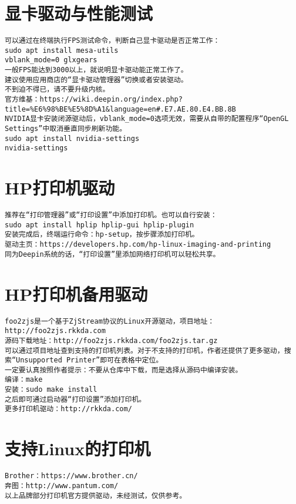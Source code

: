 \documentclass[a4paper,fontset=fandol,zihao=-4,linespread=1.2,oneside]{ctexbook}
\begin{document}
\section{显卡驱动与性能测试}
\begin{lstlisting}
可以通过在终端执行FPS测试命令，判断自己显卡驱动是否正常工作：
sudo apt install mesa-utils
vblank_mode=0 glxgears
一般FPS能达到3000以上，就说明显卡驱动能正常工作了。
建议使用应用商店的“显卡驱动管理器”切换或者安装驱动。
不到迫不得已，请不要升级内核。
官方维基：https://wiki.deepin.org/index.php?title=%E6%98%BE%E5%8D%A1&language=en#.E7.AE.80.E4.BB.8B
NVIDIA显卡安装闭源驱动后，vblank_mode=0选项无效，需要从自带的配置程序“OpenGL Settings”中取消垂直同步刷新功能。
sudo apt install nvidia-settings
nvidia-settings
\end{lstlisting}

\section{HP打印机驱动}
\begin{lstlisting}
推荐在“打印管理器”或“打印设置”中添加打印机。也可以自行安装：
sudo apt install hplip hplip-gui hplip-plugin
安装完成后，终端运行命令：hp-setup，按步骤添加打印机。
驱动主页：https://developers.hp.com/hp-linux-imaging-and-printing
同为Deepin系统的话，“打印设置”里添加网络打印机可以轻松共享。
\end{lstlisting}

\section{HP打印机备用驱动}
\begin{lstlisting}
foo2zjs是一个基于ZjStream协议的Linux开源驱动，项目地址：http://foo2zjs.rkkda.com
源码下载地址：http://foo2zjs.rkkda.com/foo2zjs.tar.gz
可以通过项目地址查到支持的打印机列表。对于不支持的打印机，作者还提供了更多驱动，搜索“Unsupported Printer”即可在表格中定位。
一定要认真按照作者提示：不要从仓库中下载，而是选择从源码中编译安装。
编译：make
安装：sudo make install
之后即可通过启动器“打印设置”添加打印机。
更多打印机驱动：http://rkkda.com/
\end{lstlisting}

\section{支持Linux的打印机}
\begin{lstlisting}
Brother：https://www.brother.cn/
奔图：http://www.pantum.com/
以上品牌部分打印机官方提供驱动，未经测试，仅供参考。
\end{lstlisting}
\end{document}
